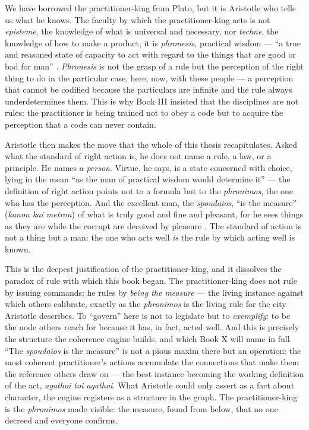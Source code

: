 We have borrowed the practitioner-king from Plato, but it is Aristotle who tells
us what he knows. The faculty by which the practitioner-king acts is not
\emph{episteme}, the knowledge of what is universal and necessary, nor
\emph{techne}, the knowledge of how to make a product; it is \emph{phronesis},
practical wisdom --- ``a true and reasoned state of capacity to act with regard to
the things that are good or bad for man'' \parencite[VI.5]{aristotle2000ethics}.
\emph{Phronesis} is not the grasp of a rule but the perception of the right thing
to do in the particular case, here, now, with these people --- a perception that
cannot be codified because the particulars are infinite and the rule always
underdetermines them. This is why Book III insisted that the disciplines are not
rules: the practitioner is being trained not to obey a code but to acquire the
perception that a code can never contain.

Aristotle then makes the move that the whole of this thesis recapitulates. Asked
what the standard of right action is, he does not name a rule, a law, or a
principle. He names a \emph{person}. Virtue, he says, is a state concerned with
choice, lying in the mean ``as the man of practical wisdom would determine it''
\parencite[II.6]{aristotle2000ethics} --- the definition of right action points not
to a formula but to the \emph{phronimos}, the one who has the perception. And the
excellent man, the \emph{spoudaios}, ``is the measure'' (\emph{kanon kai metron})
of what is truly good and fine and pleasant, for he sees things as they are while
the corrupt are deceived by pleasure \parencite[III.4, X.5]{aristotle2000ethics}.
The standard of action is not a thing but a man: the one who acts well \emph{is}
the rule by which acting well is known.

This is the deepest justification of the practitioner-king, and it dissolves the
paradox of rule with which this book began. The practitioner-king does not rule by
issuing commands; he rules by \emph{being the measure} --- the living instance
against which others calibrate, exactly as the \emph{phronimos} is the living rule
for the city Aristotle describes. To ``govern'' here is not to legislate but to
\emph{exemplify}: to be the node others reach for because it has, in fact, acted
well. And this is precisely the structure the coherence engine builds, and which
Book X will name in full. ``The \emph{spoudaios} is the measure'' is not a pious
maxim there but an operation: the most coherent practitioner's actions accumulate
the connections that make them the reference others draw on --- the best instance
becoming the working definition of the act, \emph{agathoi toi agathoi}. What
Aristotle could only assert as a fact about character, the engine registers as a
structure in the graph. The practitioner-king is the \emph{phronimos} made
visible: the measure, found from below, that no one decreed and everyone confirms.

